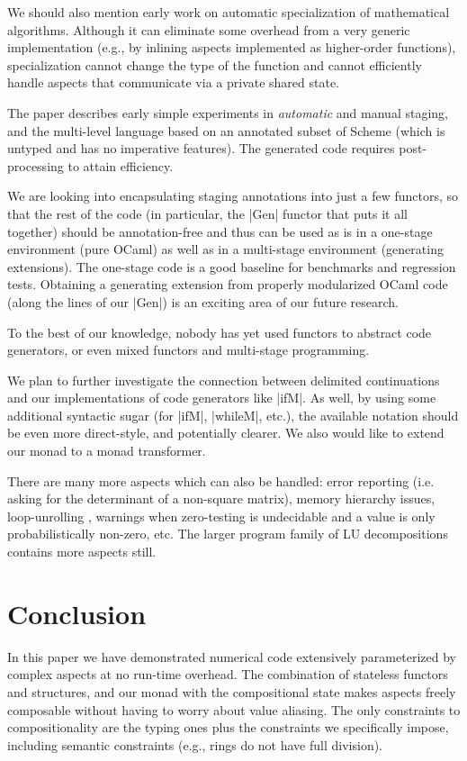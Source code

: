 \documentclass[draft]{elsart}
\begin{document}
We should also mention early work \cite{Gluck95} on automatic
specialization of mathematical algorithms. Although it can eliminate
some overhead from a very generic implementation (e.g., by inlining
aspects implemented as higher-order functions), specialization cannot
change the type of the function and cannot efficiently handle aspects
that communicate via a private shared state.

The paper \cite{GluckJ97} describes early simple experiments in
\emph{automatic} and manual staging, and the multi-level language
based on an annotated subset of Scheme (which is untyped and has no
imperative features). The generated code requires post-processing to
attain efficiency.  

We are looking into encapsulating staging
annotations into just a few functors, so that the rest of the code (in
particular, the |Gen| functor that puts it all together) should be
annotation-free and thus can be used as is in a one-stage environment
(pure OCaml) as well as in a multi-stage environment (generating
extensions). The one-stage code is a good baseline for benchmarks and
regression tests. Obtaining a generating extension from properly
modularized OCaml code (along the lines of our |Gen|) is an exciting
area of our future research.

To the best of our knowledge, nobody has yet used functors to
abstract code generators, or even mixed functors and 
multi-stage programming.

We plan to further investigate the connection between delimited
continuations and our implementations of code generators like
|ifM|.  As well, by using some additional syntactic sugar
(for |ifM|, |whileM|, etc.), the available notation should be
even more direct-style, and potentially clearer.
We also would like to extend our monad to a monad transformer.

There are many more aspects which can also be handled:
error reporting (i.e. asking for the determinant of a 
non-square matrix), memory hierarchy issues, loop-unrolling
\cite{Padua:MetaOcaml:04},
warnings when zero-testing is undecidable and
a value is only probabilistically non-zero, etc.  The larger program
family of LU decompositions contains more aspects still.

\section{Conclusion}\label{conclusion}
In this paper we have demonstrated numerical code extensively parameterized
by complex aspects at no run-time overhead.  The combination of
stateless functors and structures, and our monad with the
compositional state makes aspects freely composable without having to
worry about value aliasing. The only constraints to compositionality
are the typing ones plus the constraints we specifically
impose, including semantic constraints (e.g., rings do not have full
division).
\end{document}
